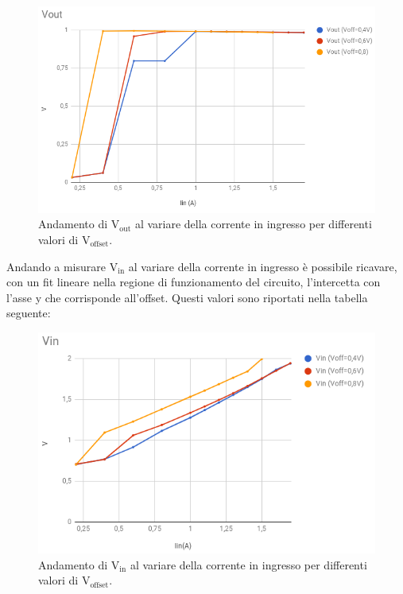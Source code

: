 \begin{figure}
\centering
\includegraphics[scale=.4]{Immagini/VoutVsVoffset}
\caption{Andamento di $\mathrm{V_{out}}$ al variare della corrente in ingresso per differenti valori di $\mathrm{V_{offset}}$.}
\label{VoutVsVoffset}
\end{figure}

Andando a misurare $\mathrm{V_{in}}$ al variare della corrente in ingresso è possibile ricavare, con un fit lineare nella regione di funzionamento del circuito, l'intercetta con l'asse y che corrisponde all'offset. 
Questi valori sono riportati nella tabella seguente:

\begin{figure}
\centering
\includegraphics[scale=.4]{Immagini/VinVsVoffset}
\caption{Andamento di $\mathrm{V_{in}}$ al variare della corrente in ingresso per differenti valori di $\mathrm{V_{offset}}$.}
\label{VinVsVoffset}
\end{figure}

